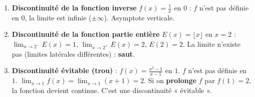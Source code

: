 \documentclass[11pt]{article}
\begin{document}
\begin{exemplebox}
\begin{enumerate}
    \item \textbf{Discontinuité de la fonction inverse} $f(x) = \frac{1}{x}$ en $0$ : $f$ n'est pas définie en $0$, la limite est infinie ($\pm\infty$). Asymptote verticale.
    \item \textbf{Discontinuité de la fonction partie entière} $E(x) = \lfloor x \rfloor$ en $x = 2$ :
    $\lim_{x \to 2^-} E(x) = 1$, $\lim_{x \to 2^+} E(x) = 2$, $E(2) = 2$.
    La limite n'existe pas (limites latérales différentes) : \textbf{saut}.
    \item \textbf{Discontinuité évitable (trou)} : $f(x) = \frac{x^2-1}{x-1}$ en $1$.
    $f$ n'est pas définie en $1$. $\lim_{x \to 1} f(x) = \lim_{x \to 1} (x+1) = 2$.
    Si on \textbf{prolonge} $f$ par $f(1)=2$, la fonction devient continue. C'est une discontinuité « évitable ».
\end{enumerate}
\end{exemplebox}
\end{document}
